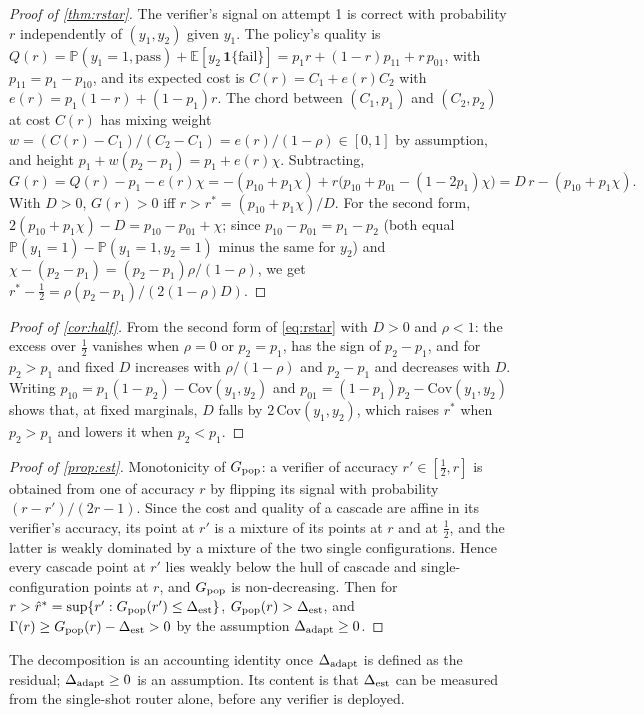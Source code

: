 \documentclass[11pt,a4paper]{article}
\theoremstyle{definition}
\theoremstyle{remark}
\theoremstyle{definition}
\newcommand{\E}{\mathbb{E}}
\renewcommand{\Pr}{\mathbb{P}}
\begin{document}
\begin{proof}[Proof of \cref{thm:rstar}]
The verifier's signal on attempt 1 is correct with probability $r$ independently of $(y_1,y_2)$ given $y_1$. The policy's quality is
$Q(r)=\Pr(y_1=1,\text{pass})+\E[y_2\,\mathbf 1\{\text{fail}\}]=p_1r+(1-r)p_{11}+r\,p_{01}$, with $p_{11}=p_1-p_{10}$, and its expected cost is $C(r)=C_1+e(r)C_2$ with $e(r)=p_1(1-r)+(1-p_1)r$. The chord between $(C_1,p_1)$ and $(C_2,p_2)$ at cost $C(r)$ has mixing weight $w=(C(r)-C_1)/(C_2-C_1)=e(r)/(1-\rho)\in[0,1]$ by assumption, and height $p_1+w(p_2-p_1)=p_1+e(r)\chi$. Subtracting,
\[
G(r)=Q(r)-p_1-e(r)\chi=-(p_{10}+p_1\chi)+r\big(p_{10}+p_{01}-(1-2p_1)\chi\big)=D\,r-(p_{10}+p_1\chi).
\]
With $D>0$, $G(r)>0$ iff $r>r^\ast=(p_{10}+p_1\chi)/D$. For the second form, $2(p_{10}+p_1\chi)-D=p_{10}-p_{01}+\chi$; since $p_{10}-p_{01}=p_1-p_2$ (both equal $\Pr(y_1=1)-\Pr(y_1=1,y_2=1)$ minus the same for $y_2$) and $\chi-(p_2-p_1)=(p_2-p_1)\rho/(1-\rho)$, we get $r^\ast-\tfrac12=\rho(p_2-p_1)/(2(1-\rho)D)$.
\end{proof}

\begin{proof}[Proof of \cref{cor:half}]
From the second form of \eqref{eq:rstar} with $D>0$ and $\rho<1$: the excess over $\tfrac12$ vanishes when $\rho=0$ or $p_2=p_1$, has the sign of $p_2-p_1$, and for $p_2>p_1$ and fixed $D$ increases with $\rho/(1-\rho)$ and $p_2-p_1$ and decreases with $D$. Writing $p_{10}=p_1(1-p_2)-\mathrm{Cov}(y_1,y_2)$ and $p_{01}=(1-p_1)p_2-\mathrm{Cov}(y_1,y_2)$ shows that, at fixed marginals, $D$ falls by $2\,\mathrm{Cov}(y_1,y_2)$, which raises $r^\ast$ when $p_2>p_1$ and lowers it when $p_2<p_1$.
\end{proof}

\begin{proof}[Proof of \cref{prop:est}]
Monotonicity of $G_{\rm pop}$: a verifier of accuracy $r'\in[\tfrac12,r]$ is obtained from one of accuracy $r$ by flipping its signal with probability $(r-r')/(2r-1)$. Since the cost and quality of a cascade are affine in its verifier's accuracy, its point at $r'$ is a mixture of its points at $r$ and at $\tfrac12$, and the latter is weakly dominated by a mixture of the two single configurations. Hence every cascade point at $r'$ lies weakly below the hull of cascade and single-configuration points at $r$, and $G_{\rm pop}$ is non-decreasing. Then for $r>\hat r^\ast=\sup\{r':G_{\rm pop}(r')\le\Delta_{\rm est}\}$, $G_{\rm pop}(r)>\Delta_{\rm est}$, and $\Gamma(r)\ge G_{\rm pop}(r)-\Delta_{\rm est}>0$ by the assumption $\Delta_{\rm adapt}\ge0$.
\end{proof}
The decomposition is an accounting identity once $\Delta_{\rm adapt}$ is defined as the residual; $\Delta_{\rm adapt}\ge0$ is an assumption. Its content is that $\Delta_{\rm est}$ can be measured from the single-shot router alone, before any verifier is deployed.
\end{document}
